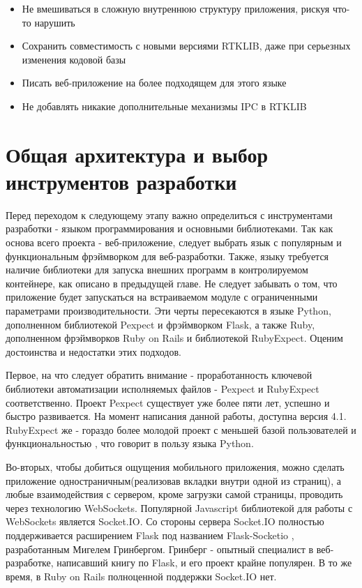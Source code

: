 \begin{itemize}
  \item Не вмешиваться в сложную внутреннюю структуру приложения, рискуя что-то нарушить
  \item Сохранить совместимость с новыми версиями RTKLIB, даже при серьезных изменения кодовой базы
  \item Писать веб-приложение на более подходящем для этого языке
  \item Не добавлять никакие дополнительные механизмы IPC в RTKLIB
\end{itemize}


\section{Общая архитектура и выбор инструментов разработки} \label{sect2_4}

Перед переходом к следующему этапу важно определиться с инструментами разработки - языком программирования и основными библиотеками. Так как основа всего проекта - веб-приложение, следует выбрать язык с популярным и функциональным фрэймворком для веб-разработки. Также, языку требуется наличие библиотеки для запуска внешних программ в контролируемом контейнере, как описано в предыдущей главе. Не следует забывать о том, что приложение будет запускаться на встраиваемом модуле с ограниченными параметрами производительности. Эти черты пересекаются в языке Python, дополненном библиотекой Pexpect и фрэймворком Flask, а также Ruby, дополненном фрэймворков Ruby on Rails и библиотекой RubyExpect. Оценим достоинства и недостатки этих подходов.

Первое, на что следует обратить внимание - проработанность ключевой библиотеки автоматизации исполняемых файлов - Pexpect и RubyExpect соответственно. Проект Pexpect \cite{pexpect-docs} существует уже более пяти лет, успешно и быстро развивается. На момент написания данной работы, доступна версия 4.1. RubyExpect же - гораздо более молодой проект с меньшей базой пользователей и функциональностью \cite{rubyexpect-docs}, что говорит в пользу языка Python.

Во-вторых, чтобы добиться ощущения мобильного приложения, можно сделать приложение одностраничным(реализовав вкладки внутри одной из страниц), а любые взаимодействия с сервером, кроме загрузки самой страницы, проводить через технологию WebSockets. Популярной Javascript библиотекой для работы с WebSockets является Socket.IO. Со стороны сервера Socket.IO полностью поддерживается расширением Flask под названием Flask-Socketio \cite{flask-socketio-docs}, разработанным Мигелем Гринбергом. Гринберг - опытный специалист в веб-разработке, написавший книгу по Flask, и его проект крайне популярен. В то же время, в Ruby on Rails полноценной поддержки Socket.IO нет.


